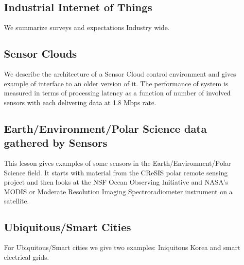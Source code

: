 

\subsection{Industrial Internet of Things}\label{industrial-internet-of-things}

We summarize surveys and expectations Industry wide.



\subsection{Sensor Clouds}\label{sensor-clouds}

We describe the architecture of a Sensor Cloud control environment and
gives example of interface to an older version of it. The performance of
system is measured in terms of processing latency as a function of
number of involved sensors with each delivering data at 1.8 Mbps rate.



\subsection{Earth/Environment/Polar Science data gathered by
Sensors}\label{earthenvironmentpolar-science-data-gathered-by-sensors}

This lesson gives examples of some sensors in the
Earth/Environment/Polar Science field. It starts with material from the
CReSIS polar remote sensing project and then looks at the NSF Ocean
Observing Initiative and NASA's MODIS or Moderate Resolution Imaging
Spectroradiometer instrument on a satellite.



\subsection{Ubiquitous/Smart Cities}\label{ubiquitoussmart-cities}

For Ubiquitous/Smart cities we give two examples: Iniquitous Korea and
smart electrical grids.



